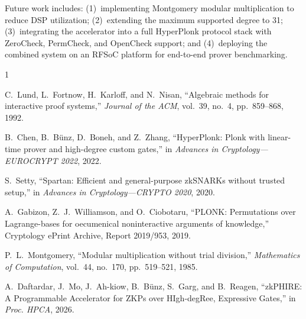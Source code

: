 \documentclass[conference]{IEEEtran}
\begin{document}
Future work includes: (1)~implementing Montgomery modular multiplication to reduce DSP utilization; (2)~extending the maximum supported degree to 31; (3)~integrating the accelerator into a full HyperPlonk protocol stack with ZeroCheck, PermCheck, and OpenCheck support; and (4)~deploying the combined system on an RFSoC platform for end-to-end prover benchmarking.


\begin{thebibliography}{1}

C.~Lund, L.~Fortnow, H.~Karloff, and N.~Nisan,
``Algebraic methods for interactive proof systems,''
\textit{Journal of the ACM}, vol.~39, no.~4, pp.~859--868, 1992.

B.~Chen, B.~B{\"u}nz, D.~Boneh, and Z.~Zhang,
``HyperPlonk: Plonk with linear-time prover and high-degree custom gates,''
in \textit{Advances in Cryptology---EUROCRYPT 2022}, 2022.

S.~Setty,
``Spartan: Efficient and general-purpose zkSNARKs without trusted setup,''
in \textit{Advances in Cryptology---CRYPTO 2020}, 2020.

A.~Gabizon, Z.~J.~Williamson, and O.~Ciobotaru,
``PLONK: Permutations over Lagrange-bases for oecumenical noninteractive arguments of knowledge,''
Cryptology ePrint Archive, Report 2019/953, 2019.

P.~L.~Montgomery,
``Modular multiplication without trial division,''
\textit{Mathematics of Computation}, vol.~44, no.~170, pp.~519--521, 1985.

A.~Daftardar, J.~Mo, J.~Ah-kiow, B.~B{\"u}nz, S.~Garg, and B.~Reagen,
``zkPHIRE: A Programmable Accelerator for ZKPs over HIgh-degRee, Expressive Gates,''
in \textit{Proc. HPCA}, 2026.

\end{thebibliography}
\end{document}
